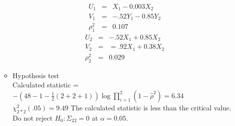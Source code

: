 \documentclass{article}
\begin{document}
\begin{itemize}
\begin{itemize}
\begin{eqnarray*}
U_1 & = & X_1 - 0.003X_2 \\
V_1 & = & -.52Y_1 - 0.85Y_2\\
\rho^2_1 & = & 0.107
\end{eqnarray*}
\begin{eqnarray*}
U_2 & = & -.52X_1 + 0.85X_2 \\
V_2 & = & =.92X_1 + 0.38X_2 \\
\rho^2_2 & = & 0.029
\end{eqnarray*}
\item Hypothesis test \\
Calculated statistic = $-(48 - 1 - \frac{1}{2} (2 + 2 + 1))\log\prod_{i = 1}^2(1 - \hat{\rho}^2) = 6.34$\\
$\chi^2_{2*2}(.05) = 9.49$
The calculated statistic is less than the critical value. Do not reject $H_0: \Sigma_{22} = 0$ at $\alpha = 0.05$.
\end{itemize}
\end{itemize}
\end{document}
